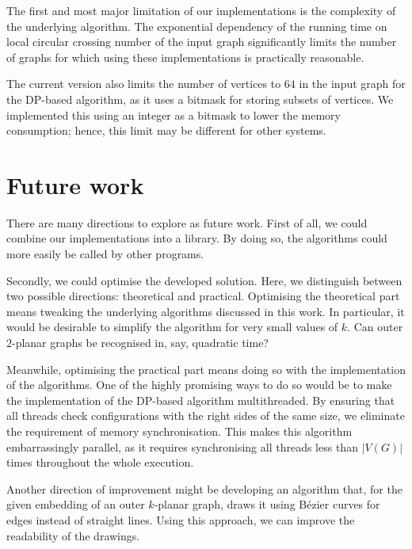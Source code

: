 The first and most major limitation of our implementations is the complexity of the underlying algorithm. The exponential dependency of the running time on local circular crossing number of the input graph significantly limits the number of graphs for which using these implementations is practically reasonable.

The current version also limits the number of vertices to \(64\) in the input graph for the DP-based algorithm, as it uses a bitmask for storing subsets of vertices. We implemented this using an integer as a bitmask to lower the memory consumption; hence, this limit may be different for other systems.

\section{Future work}

There are many directions to explore as future work. First of all, we could combine our implementations into a library. By doing so, the algorithms could more easily be called by other programs.

Secondly, we could optimise the developed solution. Here, we distinguish between two possible directions: theoretical and practical. Optimising the theoretical part means tweaking the underlying algorithms discussed in this work. In particular, it would be desirable to simplify the algorithm for very small values of \(k\). Can outer \(2\)-planar graphs be recognised in, say, quadratic time?

Meanwhile, optimising the practical part means doing so with the implementation of the algorithms. One of the highly promising ways to do so would be to make the implementation of the DP-based algorithm multithreaded. By ensuring that all threads check configurations with the right sides of the same size, we eliminate the requirement of memory synchronisation. This makes this algorithm embarrassingly parallel, as it requires synchronising all threads less than \(|V(G)|\) times throughout the whole execution.

Another direction of improvement might be developing an algorithm that, for the given embedding of an outer \(k\)-planar graph, draws it using Bézier curves for edges instead of straight lines. Using this approach, we can improve the readability of the drawings.
